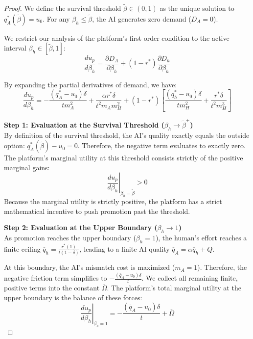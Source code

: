 \documentclass[mnsc,nonblindrev]{informs3_NoOR}
\begin{document}
\begin{proof}
We define the survival threshold $\tilde{\beta} \in (0, 1)$ as the unique solution to $q_A^*(\tilde{\beta}) = u_0$. For any $\beta_h \le \tilde{\beta}$, the AI generates zero demand ($D_A = 0$).

We restrict our analysis of the platform's first-order condition to the active interval $\beta_h \in [\tilde{\beta}, 1]$:
\begin{equation}
    \frac{du_p}{d\beta_h} = \frac{\partial D_A}{\partial \beta_h} + (1-r^*)\frac{\partial D_h}{\partial \beta_h}
\end{equation}

By expanding the partial derivatives of demand, we have:
\begin{equation}
    \frac{du_p}{d\beta_h} = -\frac{(q_A^* - u_0)\delta}{tm_A^2}+ \frac{\alpha r^* \delta}{t^2 m_A m_H^2} + (1-r^*) \left[ \frac{(q_h^* - u_0)\delta}{tm_H^2} + \frac{r^* \delta}{t^2 m_H^3} \right]
\end{equation}

\vspace{0.3cm}
\noindent \textbf{Step 1: Evaluation at the Survival Threshold ($\beta_h \to \tilde{\beta}^+$)} \\
By definition of the survival threshold, the AI's quality exactly equals the outside option: $q_A^*(\tilde{\beta}) - u_0 = 0$. Therefore, the negative term evaluates to exactly zero. The platform's marginal utility at this threshold consists strictly of the positive marginal gains:
\begin{equation}
    \left. \frac{du_p}{d\beta_h} \right|_{\beta_h = \tilde{\beta}} > 0
\end{equation}
Because the marginal utility is strictly positive, the platform has a strict mathematical incentive to push promotion past the threshold.

\vspace{0.3cm}
\noindent \textbf{Step 2: Evaluation at the Upper Boundary ($\beta_h \to 1$)} \\
As promotion reaches the upper boundary ($\beta_h = 1$), the human's effort reaches a finite ceiling $\overline{q}_h = \frac{r^*(1)}{t(1-\delta)}$, leading to a finite AI quality $\overline{q}_A = \alpha\overline{q}_h + Q$.

At this boundary, the AI's mismatch cost is maximized ($m_A = 1$). Therefore, the negative friction term simplifies to $-\frac{(\overline{q}_A - u_0)\delta}{t}$. We collect all remaining finite, positive terms into the constant $\overline{\Omega}$. The platform's total marginal utility at the upper boundary is the balance of these forces:
\begin{equation}
    \left. \frac{du_p}{d\beta_h} \right|_{\beta_h = 1} = -\frac{(\overline{q}_A - u_0)\delta}{t} + \overline{\Omega}
\end{equation}


\end{proof}
\end{document}
